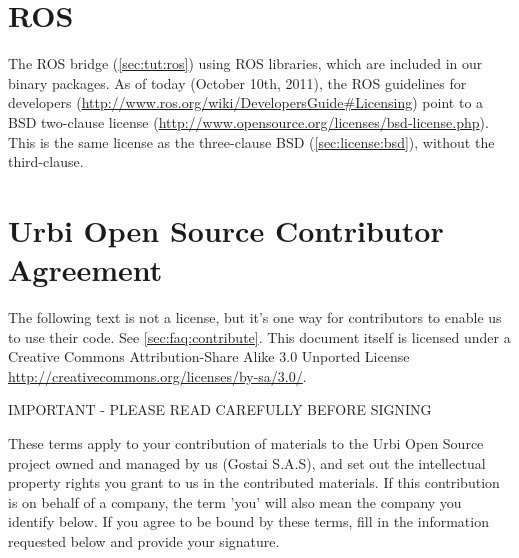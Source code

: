 
\section{ROS}

The ROS bridge (\autoref{sec:tut:ros}) using ROS libraries, which are
included in our binary packages.  As of today (October 10th, 2011), the ROS
guidelines for developers
(\url{http://www.ros.org/wiki/DevelopersGuide#Licensing}) point to a BSD
two-clause license
(\url{http://www.opensource.org/licenses/bsd-license.php}).  This is the
same license as the three-clause BSD (\autoref{sec:license:bsd}), without
the third-clause.


\clearpage
\section{Urbi Open Source Contributor Agreement}
\label{sec:license:uosca}

The following text is not a license, but it's one way for \usdk contributors
to enable us to use their code.  See \autoref{sec:faq:contribute}.  This
document itself is licensed under a Creative Commons Attribution-Share Alike
3.0 Unported License \url{http://creativecommons.org/licenses/by-sa/3.0/}.


\begin{center}
  IMPORTANT - PLEASE READ CAREFULLY BEFORE SIGNING
\end{center}

These terms apply to your contribution of materials to the Urbi Open Source
project owned and managed by us (Gostai S.A.S), and set out the intellectual
property rights you grant to us in the contributed materials. If this
contribution is on behalf of a company, the term 'you' will also mean the
company you identify below. If you agree to be bound by these terms, fill in
the information requested below and provide your signature.

